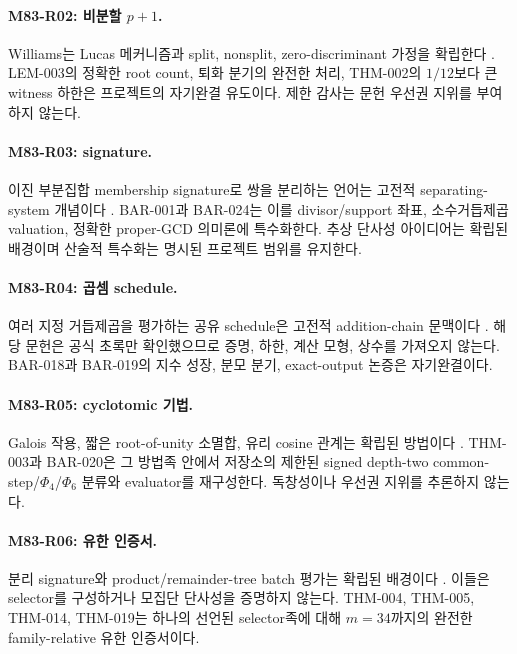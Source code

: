 \documentclass[11pt]{article}
\begin{document}
\paragraph{M83-R02: 비분할 \(p+1\).}
Williams는 Lucas 메커니즘과 split, nonsplit, zero-discriminant 가정을
확립한다 \cite{williams1982pplusone}. LEM-003의 정확한 root count,
퇴화 분기의 완전한 처리, THM-002의 \(1/12\)보다 큰 witness 하한은
프로젝트의 자기완결 유도이다. 제한 감사는 문헌 우선권 지위를
부여하지 않는다.

\paragraph{M83-R03: signature.}
이진 부분집합 membership signature로 쌍을 분리하는 언어는 고전적
separating-system 개념이다 \cite{katona1966separating}. BAR-001과
BAR-024는 이를 divisor/support 좌표, 소수거듭제곱 valuation, 정확한
proper-GCD 의미론에 특수화한다. 추상 단사성 아이디어는 확립된
배경이며 산술적 특수화는 명시된 프로젝트 범위를 유지한다.

\paragraph{M83-R04: 곱셈 schedule.}
여러 지정 거듭제곱을 평가하는 공유 schedule은 고전적 addition-chain
문맥이다 \cite{yao1976evaluation}. 해당 문헌은 공식 초록만
확인했으므로 증명, 하한, 계산 모형, 상수를 가져오지 않는다. BAR-018과
BAR-019의 지수 성장, 분모 분기, exact-output 논증은 자기완결이다.

\paragraph{M83-R05: cyclotomic 기법.}
Galois 작용, 짧은 root-of-unity 소멸합, 유리 cosine 관계는 확립된
방법이다 \cite{conway1976trigonometric}. THM-003과 BAR-020은 그
방법족 안에서 저장소의 제한된 signed depth-two
common-step/\(\Phi_4\)/\(\Phi_6\) 분류와 evaluator를 재구성한다.
독창성이나 우선권 지위를 추론하지 않는다.

\paragraph{M83-R06: 유한 인증서.}
분리 signature와 product/remainder-tree batch 평가는 확립된 배경이다
\cite{bernstein2004smoothparts}. 이들은 selector를 구성하거나 모집단
단사성을 증명하지 않는다. THM-004, THM-005, THM-014, THM-019는 하나의
선언된 selector족에 대해 \(m=34\)까지의 완전한 family-relative 유한
인증서이다.
\end{document}
